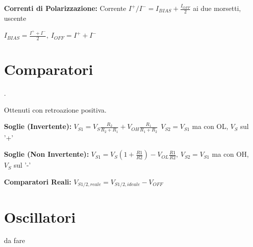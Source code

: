 \documentclass[12pt]{extarticle}
\begin{document}
{\bf Correnti di Polarizzazione:} Corrente $I^+/I^- = I_{BIAS}+\frac{I_{OFF}}{2}$ ai due morsetti, uscente

$\displaystyle I_{BIAS} = \frac{I^++I^-}{2}, \ I_{OFF} = I^++I^-$

\section{Comparatori}.

Ottenuti con retroazione positiva.

{\bf Soglie (Invertente):} $\displaystyle V_{S1} = V_S\frac{R_2}{R_2+R_1}+V_{OH}\frac{R_1}{R_1+R_2} \ \ V_{S2} = V_{S1} $ ma con OL, $V_S$ sul '+'

{\bf Soglie (Non Invertente):} $\displaystyle V_{S1} = V_S(1+\frac{R1}{R2}) - V_{OL}\frac{R1}{R2}, \ V_{S2} = V_{S1}$ ma con OH, $V_S$ sul '-'

{\bf Comparatori Reali:} $\displaystyle V_{S1/2, reale} = V_{S1/2, ideale}-V_{OFF}$

\section{Oscillatori}

da fare
\end{document}
